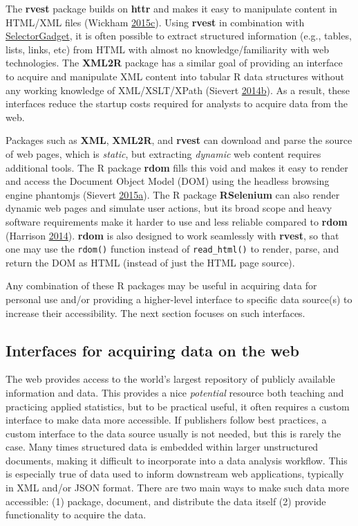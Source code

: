 \documentclass[12pt,]{isuthesis}
\begin{document}
The \textbf{rvest} package builds on \textbf{httr} and makes it easy to
manipulate content in HTML/XML files (Wickham
\protect\hyperlink{ref-rvest}{2015}\protect\hyperlink{ref-rvest}{c}).
Using \textbf{rvest} in combination with
\href{http://selectorgadget.com/}{SelectorGadget}, it is often possible
to extract structured information (e.g., tables, lists, links, etc) from
HTML with almost no knowledge/familiarity with web technologies. The
\textbf{XML2R} package has a similar goal of providing an interface to
acquire and manipulate XML content into tabular R data structures
without any working knowledge of XML/XSLT/XPath (Sievert
\protect\hyperlink{ref-Sievert:2014a}{2014}\protect\hyperlink{ref-Sievert:2014a}{b}).
As a result, these interfaces reduce the startup costs required for
analysts to acquire data from the web.

Packages such as \textbf{XML}, \textbf{XML2R}, and \textbf{rvest} can
download and parse the source of web pages, which is \emph{static}, but
extracting \emph{dynamic} web content requires additional tools. The R
package \textbf{rdom} fills this void and makes it easy to render and
access the Document Object Model (DOM) using the headless browsing
engine phantomjs (Sievert
\protect\hyperlink{ref-rdom}{2015}\protect\hyperlink{ref-rdom}{a}). The
R package \textbf{RSelenium} can also render dynamic web pages and
simulate user actions, but its broad scope and heavy software
requirements make it harder to use and less reliable compared to
\textbf{rdom} (Harrison \protect\hyperlink{ref-RSelenium}{2014}).
\textbf{rdom} is also designed to work seamlessly with \textbf{rvest},
so that one may use the \texttt{rdom()} function instead of
\texttt{read\_html()} to render, parse, and return the DOM as HTML
(instead of just the HTML page source).

Any combination of these R packages may be useful in acquiring data for
personal use and/or providing a higher-level interface to specific data
source(s) to increase their accessibility. The next section focuses on
such interfaces.

\subsection{Interfaces for acquiring data on the
web}\label{interfaces-for-acquiring-data-on-the-web}

The web provides access to the world's largest repository of publicly
available information and data. This provides a nice \emph{potential}
resource both teaching and practicing applied statistics, but to be
practical useful, it often requires a custom interface to make data more
accessible. If publishers follow best practices, a custom interface to
the data source usually is not needed, but this is rarely the case. Many
times structured data is embedded within larger unstructured documents,
making it difficult to incorporate into a data analysis workflow. This
is especially true of data used to inform downstream web applications,
typically in XML and/or JSON format. There are two main ways to make
such data more accessible: (1) package, document, and distribute the
data itself (2) provide functionality to acquire the data.
\end{document}
